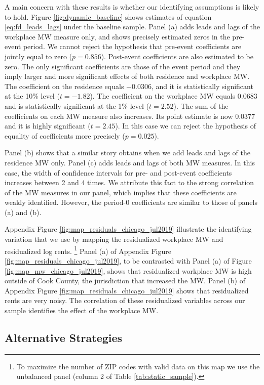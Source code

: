 A main concern with these results is whether our identifying assumptions is 
likely to hold.
Figure \ref{fig:dynamic_baseline} shows estimates of equation 
\eqref{eq:fd_leads_lags} under the baseline sample.
Panel (a) adds leads and lags of the workplace MW measure only, and shows
precisely estimated zeros in the pre-event period.
We cannot reject the hypothesis that pre-event coefficients are jointly equal
to zero ($p = 0.856$).
Post-event coefficients are also estimated to be zero.
The only significant coefficients are those of the event period and they imply 
larger and more significant effects of both residence and workplace MW.
The coefficient on the residence equals $-0.0306$, and it is 
statistically significant at the 10\% level ($t=-1.82$).
The coefficient on the workplace MW equals $0.0683$ and is 
statistically significant at the 1\% level ($t=2.52$).
The sum of the coefficients on each MW measure also increases.
Its point estimate is now $0.0377$ and it is highly significant ($t=2.45$).
In this case we can reject the hypothesis of equality of coefficients more
precisely ($p = 0.025$).

Panel (b) shows that a similar story obtains when we add leads and lags of the 
residence MW only.
Panel (c) adds leads and lags of both MW measures.
In this case, the width of confidence intervals for pre- and post-event 
coefficients increases between 2 and 4 times.
We attribute this fact to the strong correlation of the MW measures in our
panel, which implies that these coefficients are weakly identified.
However, the period-0 coefficients are similar to those of panels (a) and (b).

Appendix Figure \ref{fig:map_residuals_chicago_jul2019} illustrate the 
identifying variation that we use by mapping the residualized workplace MW and 
residualized log rents.%
\footnote{To maximize the number of ZIP codes with valid data on this map we
use the unbalanced panel (column 2 of Table \ref{tab:static_sample}).}
Panel (a) of Appendix Figure \ref{fig:map_residuals_chicago_jul2019}, to be 
contrasted with Panel (a) of Figure \ref{fig:map_mw_chicago_jul2019}, 
shows that residualized workplace MW is high outside of Cook County, the 
jurisdiction that increased the MW.
Panel (b) of Appendix Figure \ref{fig:map_residuals_chicago_jul2019} shows 
that residualized rents are very noisy.
The correlation of these residualized variables across our sample identifies
the effect of the workplace MW.

\subsection{Alternative Strategies}


